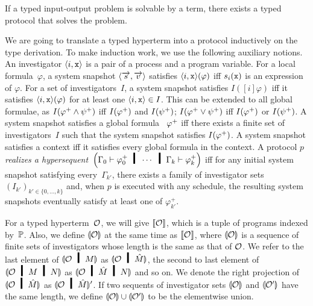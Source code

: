 {\begin{theorem}[Soundness]
If a typed input-output problem is solvable by a term,
there exists a typed protocol that solves the problem.
\end{theorem}

We are going to translate a typed hyperterm into a protocol inductively
on the type derivation.
To make induction work, we use the following auxiliary notions.
An investigator $\langle{i, \texttt{x}}\rangle$ is a pair of a process and a program
variable.
For a local formula~$\varphi$, a system snapshot $\langle{\overrightarrow s,\overrightarrow v}\rangle$
satisfies
$\langle{i,\texttt{x}}\rangle(\varphi)$ iff
$s_i(\texttt{x})$ is an expression of $\varphi$.
For a set of investigators~$I$,
a system snapshot satisfies
$I([i]\varphi)$ iff it satisfies
$\langle{i, \texttt{x}}\rangle(\varphi)$ for at least one
$\langle{i,\texttt{x}}\rangle\in I$.
This can be extended to all global formulae, as
$I({\varphi}^+\wedge{\psi}^+)$ iff $I({\varphi}^+)$ and $I({\psi}^+)$;
$I({\varphi}^+\vee{\psi}^+)$ iff $I({\varphi}^+)$ or $I({\psi}^+)$.
A system snapshot satisfies a global formula%
~${\varphi}^+$
iff there exists a
finite set of
investigators~$I$ such that the system snapshot satisfies $I({\varphi}^+)$.
A system snapshot satisfies a context%
 iff it
satisfies every global formula in the context.
A protocol $p$ \textit{realizes a hypersequent}~$
\left(\Gamma_0\vdash
\m\varphi_0 \hmid \cdots\hmid\Gamma_{k}\vdash \m\varphi_{k}\right)$
iff
for any initial system snapshot satisfying
every~$\Gamma_{k'}$,
there exists a family of investigator sets
$(I_{k'})_{k'\in\{0,\ldots,k\}}$ and,
when $p$ is executed with any schedule,
the resulting system snapshots eventually satisfy at least one of
$\varphi_{k'}^+$.

For a typed
hyperterm~$\mathcal{O}$,
we will give $\llbracket{\mathcal{O}}\rrbracket$, which is a tuple of programs indexed
by~$\mathbb{P}$.
Also, we define $\llparenthesis{\mathcal{O}}\rrparenthesis$ at the same time as
$\llbracket{\mathcal{O}}\rrbracket$, where
$\llparenthesis{\mathcal{O}}\rrparenthesis$ is a sequence of finite sets of investigators whose
length is the same as that of $\mathcal{O}$.
We refer to the last element of $\semoi{\hypert\hmid M}$ as
$\semoi{\hypert\hmid \hat{M}}$, the second to last element of
$\semoi{\hypert\hmid M\hmid N}$ as
$\semoi{\hypert\hmid \hat M\hmid N}$ and so on.
We denote the right projection of $\semoi{\hypert\hmid \hat{M}}$ as
$\semoi{\hypert\hmid \hat{M}}'$.
If two sequents of investigator sets $\llparenthesis{\mathcal{O}}\rrparenthesis$ and $\llparenthesis{\mathcal{O}'}\rrparenthesis$
have the same length, we define $\llparenthesis{\mathcal{O}}\rrparenthesis\cup \llparenthesis{\mathcal{O}'}\rrparenthesis$ to
be the elementwise union.

}
